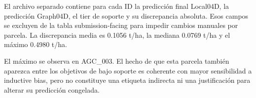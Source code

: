El archivo separado  contiene para cada ID la
predicción final Local04D, la predicción Graph04D, el tier de soporte y su discrepancia
absoluta. Esos campos se excluyen de la tabla submission-facing para impedir cambios manuales
por parcela. La discrepancia media es 0.1056 t/ha, la mediana 0.0769 t/ha y el máximo 0.4980
t/ha.

El máximo se observa en AGC\_003. El hecho de que esta parcela también aparezca entre los
objetivos de bajo soporte es coherente con mayor sensibilidad a inductive bias, pero no
constituye una etiqueta indirecta ni una justificación para alterar su predicción congelada.
